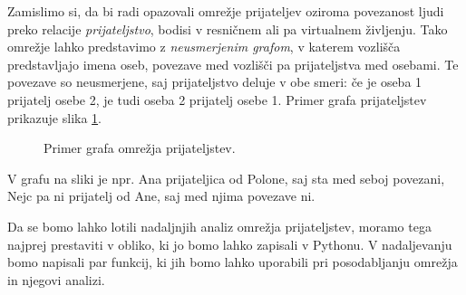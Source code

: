 Zamislimo si, da bi radi opazovali omrežje prijateljev oziroma povezanost ljudi preko relacije \emph{prijateljstvo}, bodisi v resničnem ali pa virtualnem življenju. Tako omrežje lahko predstavimo z \emph{neusmerjenim grafom}, v katerem vozlišča predstavljajo imena oseb, povezave med vozlišči pa prijateljstva med osebami. Te povezave so neusmerjene, saj prijateljstvo deluje v obe smeri: če je oseba 1 prijatelj osebe 2, je tudi oseba 2 prijatelj osebe 1. Primer grafa prijateljstev prikazuje slika \ref{img:prijatelji}.
\begin{figure}
    \centering
    \caption{Primer grafa omrežja prijateljstev.}
    \label{img:prijatelji}
\end{figure}
V grafu na sliki je npr. Ana prijateljica od Polone, saj sta med seboj povezani, Nejc pa ni prijatelj od Ane, saj med njima povezave ni. 

Da se bomo lahko lotili nadaljnjih analiz omrežja prijateljstev, moramo tega najprej prestaviti v obliko, ki jo bomo lahko zapisali v Pythonu. V nadaljevanju bomo napisali par funkcij, ki jih bomo lahko uporabili pri posodabljanju omrežja in njegovi analizi.

